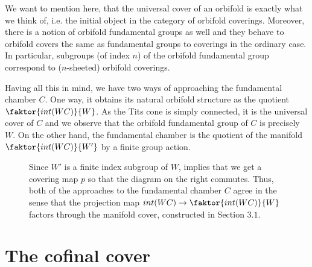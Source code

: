 \begin{remark}\label{rmk:covers}
    We want to mention here, that the universal cover of an orbifold is exactly what we think of, i.e. the initial object in the category of orbifold coverings.
    Moreover, there is a notion of orbifold fundamental groups as well and they behave to orbifold covers the same as fundamental groups to coverings in the ordinary case.
    In particular, subgroups (of index \(n\)) of the orbifold fundamental group correspond to (\(n\)-sheeted) orbifold coverings.
\end{remark}
    
Having all this in mind, we have two ways of approaching the fundamental chamber \(C\).
One way, it obtains its natural orbifold structure as the quotient \(\faktor{int(WC)}{W}\).
As the Tits cone is simply connected, it is the universal cover of \(C\) and we observe that the orbifold fundamental group of \(C\) is precisely \(W\).
On the other hand, the fundamental chamber is the quotient of the manifold \(\faktor{int(WC)}{W'}\) by a finite group action.
\vspace*{\parskip}

\begin{figure}[h!]
    \begin{minipage}[c]{.6\textwidth}
        Since \(W'\) is a finite index subgroup of \(W\),  implies that we get a covering map \(p\) so that the diagram on the right commutes.
        Thus, both of the approaches to the fundamental chamber \(C\) agree in the sense that the projection map \(int(WC) \to \faktor{int(WC)}{W}\) factors through the manifold cover, constructed in Section \(3.1\).
    \end{minipage}\quad
    \begin{minipage}{.35\textwidth}\vspace*{-1em}
    \end{minipage}
\end{figure}


\section{The cofinal cover}

